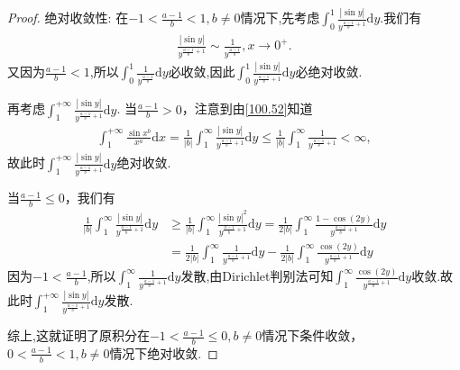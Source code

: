 \documentclass[../../main.tex]{subfiles}%
\begin{document}
\begin{proof}
{\heiti 绝对收敛性:} 在\(-1 < \frac{a - 1}{b} < 1, b\neq 0\)情况下,先考虑$\int_0^1{\frac{\left| \sin y \right|}{y^{\frac{a-1}{b}+1}}\mathrm{d}y}$.我们有
\begin{align*}
\frac{\left| \sin y \right|}{y^{\frac{a-1}{b}+1}}\sim \frac{1}{y^{\frac{a-1}{b}}},x\rightarrow 0^+.
\end{align*}
又因为$\frac{a-1}{b}<1$,所以$\int_0^1{\frac{1}{y^{\frac{a-1}{b}}}\mathrm{d}y}$必收敛,因此$\int_0^1{\frac{\left| \sin y \right|}{y^{\frac{a-1}{b}+1}}\mathrm{d}y}$必绝对收敛.

再考虑$\int_{1}^{+\infty}{\frac{\left| \sin y \right|}{y^{\frac{a-1}{b}+1}}\mathrm{d}y}$.
当\(\frac{a - 1}{b}>0\)，注意到由\eqref{100.52}知道
\begin{align*}
\int_{1}^{+\infty}\frac{\sin x^b}{x^a}\mathrm{d}x=\frac{1}{|b|}\int_{1}^{\infty}\frac{|\sin y|}{y^{\frac{a - 1}{b}+1}}\mathrm{d}y \leqslant \frac{1}{|b|}\int_{1}^{\infty}\frac{1}{y^{\frac{a - 1}{b}+1}} < \infty,
\end{align*}
故此时$\int_{1}^{+\infty}{\frac{\left| \sin y \right|}{y^{\frac{a-1}{b}+1}}\mathrm{d}y}$绝对收敛.

当\(\frac{a - 1}{b}\leqslant 0\)，我们有
\begin{align*}
\frac{1}{|b|}\int_{1}^{\infty}\frac{|\sin y|}{y^{\frac{a - 1}{b}+1}}\mathrm{d}y &\geqslant \frac{1}{|b|}\int_{1}^{\infty}\frac{|\sin y|^2}{y^{\frac{a - 1}{b}+1}}\mathrm{d}y = \frac{1}{2|b|}\int_{1}^{\infty}\frac{1 - \cos(2y)}{y^{\frac{a - 1}{b}+1}}\mathrm{d}y \\
&= \frac{1}{2|b|}\int_{1}^{\infty}\frac{1}{y^{\frac{a - 1}{b}+1}}\mathrm{d}y - \frac{1}{2|b|}\int_{1}^{\infty}\frac{\cos(2y)}{y^{\frac{a - 1}{b}+1}}\mathrm{d}y
\end{align*}
因为$-1<\frac{a-1}{b}$,所以$\int_{1}^{\infty}\frac{1}{y^{\frac{a - 1}{b}+1}}\mathrm{d}y$发散,由Dirichlet判别法可知$\int_{1}^{\infty}\frac{\cos(2y)}{y^{\frac{a - 1}{b}+1}}\mathrm{d}y$收敛.故此时$\int_{1}^{+\infty}{\frac{\left| \sin y \right|}{y^{\frac{a-1}{b}+1}}\mathrm{d}y}$发散.

综上,这就证明了原积分在\(-1 < \frac{a - 1}{b} \leqslant 0, b\neq 0\)情况下条件收敛，\(0 < \frac{a - 1}{b} < 1, b\neq 0\)情况下绝对收敛. 

\end{proof}
\end{document}
